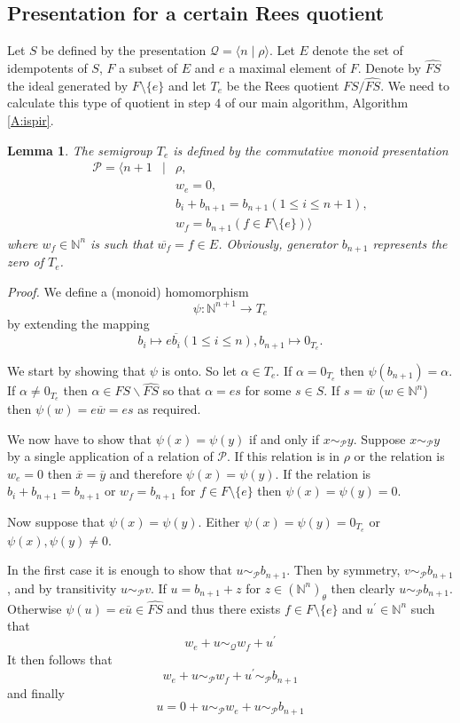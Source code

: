 \documentclass{acmconf}
\newtheorem{lemma}{Lemma}
\begin{document}
\subsection{Presentation for a certain Rees quotient}\label{s:rqpres}
Let $S$ be defined by the presentation
${\mathcal Q}=\langle n\mid \rho\rangle$.
Let $E$ denote the set of idempotents of $S$, $F$ 
a subset of $E$ and $e$ a maximal element of $F$.
Denote by $\widehat{FS}$ the ideal generated by
$F\setminus \{e\}$ and let $T_e$ be the Rees quotient
$FS/\widehat{FS}$. We need to calculate this type of
quotient in step 4 of our main 
algorithm, Algorithm \ref{A:ispir}.

\begin{lemma}
The semigroup $T_e$ is defined by the  commutative monoid presentation
\begin{eqnarray*}
\mathcal{P}=\langle n+1&\mid& \rho,\\
&&w_e=0,\\
&&b_i+b_{n+1}=b_{n+1} (1\leq i\leq n+1),\\
&& w_f=b_{n+1} (f\in F\setminus\{e\})\rangle
\end{eqnarray*}
where $w_f\in \mathbb{N}^n$ is such that $\overline{w_f}=f\in E$.
Obviously, generator $b_{n+1}$ represents the zero of $T_e$.
\end{lemma}
\emph{Proof.}
We define a (monoid) homomorphism 
$$\psi: \mathbb{N}^{n+1}\rightarrow T_e$$
by extending the mapping
$$b_i\mapsto e\overline{b_i} (1\leq i\leq n), b_{n+1}\mapsto 0_{T_e}.$$

We start by showing that $\psi$ is onto. So let $\alpha\in T_e$.
If $\alpha=0_{T_e}$ then $\psi(b_{n+1})=\alpha$.
If $\alpha\neq 0_{T_e}$ then $\alpha\in FS\backslash\widehat{FS}$
so that $\alpha=es$ for some $s\in S$. If $s=\overline{w}$
($w\in\mathbb{N}^n$) then $\psi(w)=e\overline{w}=es$ as required.

We now have to show that $\psi(x)=\psi(y)$ if and only if
$x\sim_{\mathcal{P}}y$.
Suppose $x\sim_{\mathcal{P}}y$ by a single application of a
relation of $\mathcal{P}$. If this relation is in $\rho$ or the
relation is $w_e = 0$ then $\overline{x} = \overline{y}$ and
therefore $\psi(x) = \psi(y)$. If the relation is $b_i + b_{n+1} = b_{n+1}$ 
or $w_f = b_{n+1}$ for $f \in F \setminus \{e\}$ 
then $\psi(x) = \psi(y) = 0$. 

Now suppose that $\psi(x)=\psi(y)$.
Either $\psi(x)=\psi(y)=0_{T_e}$ or $\psi(x),\psi(y)\neq 0$.

In the first case it is enough to show that $u\sim_{\mathcal{P}}b_{n+1}$. Then
by symmetry, $v\sim_{\mathcal{P}}b_{n+1}$, and 
by transitivity $u \sim_\mathcal{P} v$. 
If $u=b_{n+1}+z$ for $z\in(\mathbb{N}^n)_{\theta}$ then
clearly $u\sim_{\mathcal{P}}b_{n+1}$.
Otherwise
$\psi(u)=e\overline{u}\in\widehat{FS}$
and thus there exists $f\in F\setminus\{e\}$ and $u^{\prime}\in\mathbb{N}^n$ 
such that
$$w_e+u\sim_{\mathcal{Q}}w_f+u^{\prime}$$
It then follows that
$$w_e+u\sim_{\mathcal{P}}w_f+u^{\prime}\sim_{\mathcal{P}}b_{n+1}$$
and finally
$$u=0+u\sim_{\mathcal{P}}w_e+u\sim_{\mathcal{P}}b_{n+1}$$
\end{document}
